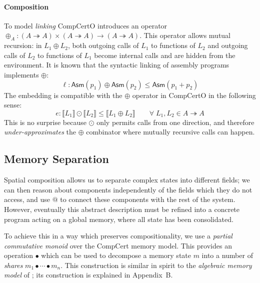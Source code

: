 \documentclass[acmsmall,screen,review,anonymous,nonacm]{acmart}
\newcommand{\kw}[1]{\ensuremath{ \mathsf{#1} }}
\begin{document}
\paragraph{Composition}
To model \textit{linking}
CompCertO introduces
an operator
$\oplus_A : (A \twoheadrightarrow A) \times (A \twoheadrightarrow A) \rightarrow (A \twoheadrightarrow A)$.
This operator allows
mutual recursion:
in $L_1 \oplus L_2$,
both outgoing calls of $L_1$ to functions of $L_2$
and outgoing calls of $L_2$ to functions of $L_1$
become internal calls
and are hidden from the environment.
It is known that
the syntactic linking
of assembly programs
implements $\oplus$:
\[
  \ell :
  \kw{Asm}(p_1) \oplus \kw{Asm}(p_2) \le
  \kw{Asm}(p_1 + p_2)
\]%
The embedding is compatible
with the $\oplus$ operator in CompCertO
in the following sense:
\[
  \mathit{e}: \llbracket L_1 \rrbracket \odot \llbracket L_2 \rrbracket
    \le  \llbracket L_1 \oplus L_2 \rrbracket
  \qquad \forall \; L_1, L_2 \in A \twoheadrightarrow A
\]
This is no surprise because
$\odot$ only permits calls
from one direction,
and therefore \emph{under-approximates}
the $\oplus$ combinator
where mutually recursive calls can happen.

\subsection{Memory Separation}
\label{sec:application:sepalg} %

Spatial composition
allows us to separate
complex states into different fields;
we can then reason about components
independently of the fields which they do not access,
and use $\mathbin@$
to connect these components with the rest of the system.
However, eventually this abstract description
must be refined into a concrete program
acting on a global memory,
where all state has been consolidated.

To achieve this in a way which preserves compositionality,
we use a \emph{partial commutative monoid}
over the CompCert memory model.
This provides an operation $\bullet$
which can be used to decompose a memory state $m$ into
a number of \emph{shares}
$
  m_1 \bullet \cdots \bullet m_n
$.
This construction
is similar in spirit to the \emph{algebraic memory model}
of \citet{ccal};
its construction is explained in Appendix~B. %
\end{document}
